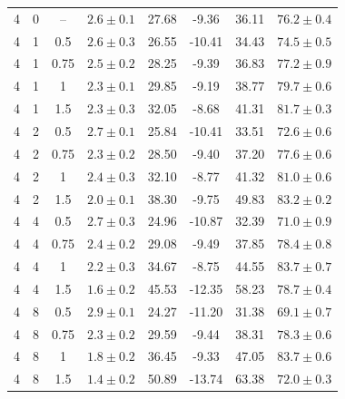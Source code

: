 \documentclass{article}
\begin{document}
\begin{table}[!htbp]
\begin{tabular}{cccccccc}
\midrule
4 & 0 & -- & $2.6\pm0.1$ & 27.68 & -9.36 & 36.11 & $76.2\pm0.4$\\
4 & 1 & 0.5 & $2.6\pm0.3$ & 26.55 & -10.41 & 34.43 & $74.5\pm0.5$\\
4 & 1 & 0.75 & $2.5\pm0.2$ & 28.25 & -9.39 & 36.83 & $77.2\pm0.9$\\
4 & 1 & 1 & $2.3\pm0.1$ & 29.85 & -9.19 & 38.77 & $79.7\pm0.6$\\
4 & 1 & 1.5 & $2.3\pm0.3$ & 32.05 & -8.68 & 41.31 & $81.7\pm0.3$\\
4 & 2 & 0.5 & $2.7\pm0.1$ & 25.84 & -10.41 & 33.51 & $72.6\pm0.6$\\
4 & 2 & 0.75 & $2.3\pm0.2$ & 28.50 & -9.40 & 37.20 & $77.6\pm0.6$\\
4 & 2 & 1 & $2.4\pm0.3$ & 32.10 & -8.77 & 41.32 & $81.0\pm0.6$\\
4 & 2 & 1.5 & $2.0\pm0.1$ & 38.30 & -9.75 & 49.83 & $83.2\pm0.2$\\
4 & 4 & 0.5 & $2.7\pm0.3$ & 24.96 & -10.87 & 32.39 & $71.0\pm0.9$\\
4 & 4 & 0.75 & $2.4\pm0.2$ & 29.08 & -9.49 & 37.85 & $78.4\pm0.8$\\
4 & 4 & 1 & $2.2\pm0.3$ & 34.67 & -8.75 & 44.55 & $83.7\pm0.7$\\
4 & 4 & 1.5 & $1.6\pm0.2$ & 45.53 & -12.35 & 58.23 & $78.7\pm0.4$\\
4 & 8 & 0.5 & $2.9\pm0.1$ & 24.27 & -11.20 & 31.38 & $69.1\pm0.7$\\
4 & 8 & 0.75 & $2.3\pm0.2$ & 29.59 & -9.44 & 38.31 & $78.3\pm0.6$\\
4 & 8 & 1 & $1.8\pm0.2$ & 36.45 & -9.33 & 47.05 & $83.7\pm0.6$\\
4 & 8 & 1.5 & $1.4\pm0.2$ & 50.89 & -13.74 & 63.38 & $72.0\pm0.3$\\
\bottomrule
\end{tabular}
\end{table}
\clearpage
\end{document}
